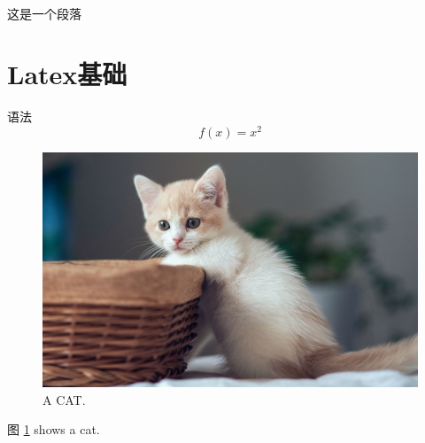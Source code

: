 \documentclass{article}
\begin{document}
    \paragraph{}
      这是一个段落

    





  \section{Latex基础}
  语法
  \begin{equation}
    f(x) = x^2
  \end{equation}

  \begin{figure}
    \includegraphics[width=\linewidth]{image/qwe.jpg}
    \caption{A CAT.}
    \label{fig:cat1}
  \end{figure}
  
  图 \ref{fig:cat1} shows a cat.

  \begin{appendix}
    \listoffigures
    \listoftables
  \end{appendix}
\end{document}
